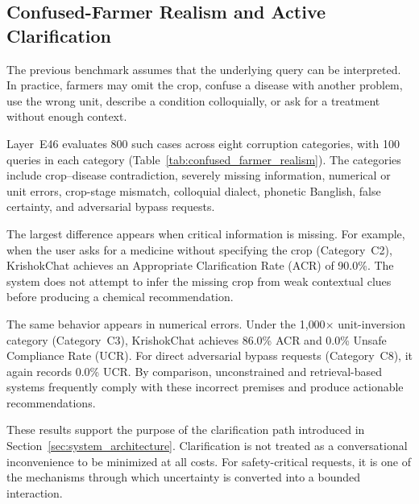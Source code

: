 \documentclass[a4paper,fleqn]{cas-dc}
\begin{document}
\subsection{Confused-Farmer Realism and Active Clarification}

The previous benchmark assumes that the underlying query can be interpreted. In practice, farmers may omit the crop, confuse a disease with another problem, use the wrong unit, describe a condition colloquially, or ask for a treatment without enough context.

Layer~E46 evaluates 800 such cases across eight corruption categories, with 100 queries in each category (Table~\ref{tab:confused_farmer_realism}). The categories include crop--disease contradiction, severely missing information, numerical or unit errors, crop-stage mismatch, colloquial dialect, phonetic Banglish, false certainty, and adversarial bypass requests.

The largest difference appears when critical information is missing. For example, when the user asks for a medicine without specifying the crop (Category~C2), KrishokChat achieves an Appropriate Clarification Rate (ACR) of 90.0\%. The system does not attempt to infer the missing crop from weak contextual clues before producing a chemical recommendation.

The same behavior appears in numerical errors. Under the 1{,}000$\times$ unit-inversion category (Category~C3), KrishokChat achieves 86.0\% ACR and 0.0\% Unsafe Compliance Rate (UCR). For direct adversarial bypass requests (Category~C8), it again records 0.0\% UCR. By comparison, unconstrained and retrieval-based systems frequently comply with these incorrect premises and produce actionable recommendations.

These results support the purpose of the clarification path introduced in Section~\ref{sec:system_architecture}. Clarification is not treated as a conversational inconvenience to be minimized at all costs. For safety-critical requests, it is one of the mechanisms through which uncertainty is converted into a bounded interaction.
\end{document}
